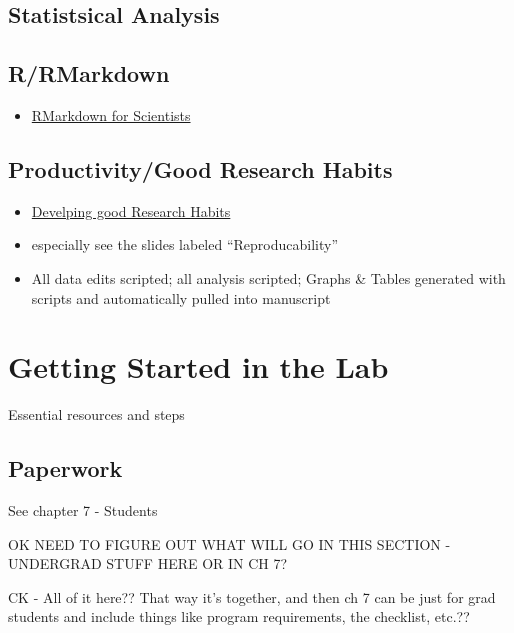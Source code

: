 \documentclass[
]{book}
\providecommand{\tightlist}{%
  \setlength{\itemsep}{0pt}\setlength{\parskip}{0pt}}
\begin{document}
\hypertarget{statistsical-analysis}{%
\section{Statistsical Analysis}\label{statistsical-analysis}}

\hypertarget{rrmarkdown}{%
\section{R/RMarkdown}\label{rrmarkdown}}

\begin{itemize}
\tightlist
\item
  \href{https://rmd4sci.njtierney.com/}{RMarkdown for Scientists}
\end{itemize}

\hypertarget{productivitygood-research-habits}{%
\section{Productivity/Good Research Habits}\label{productivitygood-research-habits}}

\begin{itemize}
\tightlist
\item
  \href{file:///C:/Users/bohil/Downloads/ResearchHabits.pdf}{Develping good Research Habits}
\item
  especially see the slides labeled ``Reproducability''
\item
  All data edits scripted; all analysis scripted; Graphs \& Tables generated with scripts and automatically pulled into manuscript
\end{itemize}

\hypertarget{getting_started}{%
\chapter{Getting Started in the Lab}\label{getting_started}}

Essential resources and steps

\hypertarget{paperwork}{%
\section{Paperwork}\label{paperwork}}

See chapter 7 - Students

OK NEED TO FIGURE OUT WHAT WILL GO IN THIS SECTION - UNDERGRAD STUFF HERE OR IN CH 7?

CK - All of it here?? That way it's together, and then ch 7 can be just for grad students and include things like program requirements, the checklist, etc.??
\end{document}
